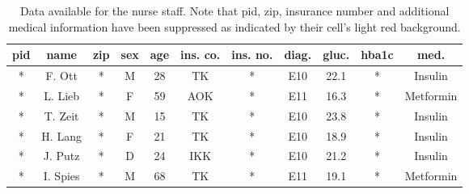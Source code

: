 \begin{table}[ht]
    \begin{center}
    \footnotesize{
        \renewcommand{\arraystretch}{1.5}
        \begin{tabular}{ | c | c | c | c | c | c | c | c | c | c | c | } 
            \hline
            \cellcolor{lightred} pid & name & \cellcolor{lightred} zip & sex & age & ins. co. & \cellcolor{lightred} ins. no. & diag. & gluc. & \cellcolor{lightred} hba1c & med. \\
            \hline
            \cellcolor{lightred} * & F. Ott & \cellcolor{lightred} * & M & 28 & TK & \cellcolor{lightred} * & E10 & 22.1 & \cellcolor{lightred} * & Insulin \\
            \hline
            \cellcolor{lightred} * & L. Lieb & \cellcolor{lightred} * & F & 59 & AOK & \cellcolor{lightred} * & E11 & 16.3 & \cellcolor{lightred} * & Metformin \\
            \hline 
            \cellcolor{lightred} * & T. Zeit & \cellcolor{lightred} * & M & 15 & TK & \cellcolor{lightred} * & E10 & 23.8 & \cellcolor{lightred} * & Insulin \\
            \hline
            \cellcolor{lightred} * & H. Lang & \cellcolor{lightred} * & F & 21 & TK & \cellcolor{lightred} * & E10 & 18.9 & \cellcolor{lightred} * & Insulin \\
            \hline
            \cellcolor{lightred} * & J. Putz & \cellcolor{lightred} * & D & 24 & IKK & \cellcolor{lightred} * & E10 & 21.2 & \cellcolor{lightred} * & Insulin \\
            \hline
            \cellcolor{lightred} * & I. Spies & \cellcolor{lightred} * & M & 68 & TK & \cellcolor{lightred} * & E11 & 19.1 & \cellcolor{lightred} * & Metformin \\
            \hline
        \end{tabular}
    }
    \caption{Data available for the nurse staff. Note that pid, zip, insurance number and additional medical information have been suppressed as indicated by their cell's light red background.}
    \label{table:nurse}
    \end{center}
\end{table}

